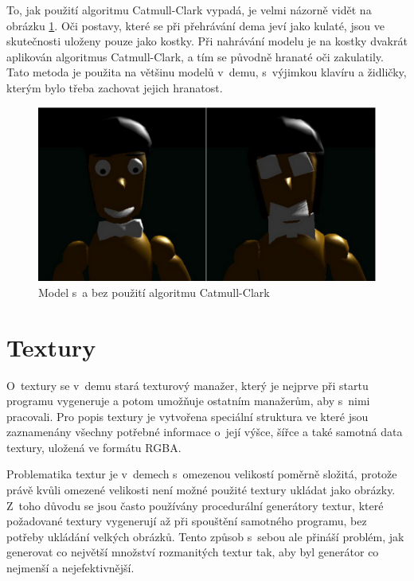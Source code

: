 To, jak použití algoritmu Catmull-Clark vypadá, je velmi názorně vidět na obrázku \ref{catmullClarkFIG}.
Oči postavy, které se při přehrávání dema jeví jako kulaté, jsou ve skutečnosti uloženy pouze jako kostky.
Při nahrávání modelu je na kostky dvakrát aplikován algoritmus Catmull-Clark, a tím se původně hranaté oči zakulatily.
Tato metoda je použita na většinu modelů v~demu, s~výjimkou klavíru a židličky, kterým bylo třeba zachovat jejich hranatost.
\begin{figure}[h]
    \begin{center}
      \includegraphics[scale=0.32]{fig/catmullClark} 
      \caption{Model s~a bez použití algoritmu Catmull-Clark} 
      \label{catmullClarkFIG}
    \end{center}
\end{figure}


\chapter{Textury} \label{textury}
O~textury se v~demu stará texturový manažer, který je nejprve při startu programu vygeneruje a potom umožňuje ostatním manažerům, aby s~nimi pracovali.
Pro popis textury je vytvořena speciální struktura ve které jsou zaznamenány všechny potřebné informace o~její výšce, šířce a také samotná data textury, uložená ve formátu RGBA.

Problematika textur je v~demech s~omezenou velikostí poměrně složitá, protože právě kvůli omezené velikosti není možné použité textury ukládat jako obrázky.
Z~toho důvodu se jsou často používány procedurální generátory textur, které požadované textury vygenerují až při   spouštění samotného programu, bez potřeby ukládání velkých obrázků. \cite{texturesCON}
Tento způsob s~sebou ale přináší problém, jak generovat co největší množství rozmanitých textur tak, aby byl generátor co nejmenší a nejefektivnější.

